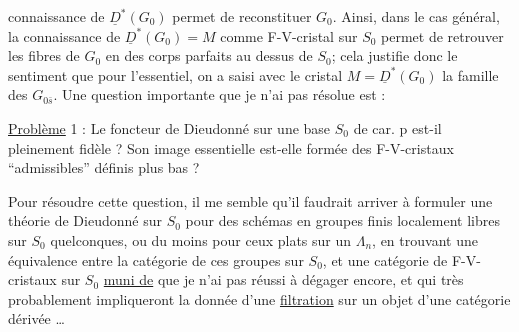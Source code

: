 connaissance de $\underline D^*(G_0)$ permet de reconstituer $G_0$. Ainsi, dans le cas général, la connaissance de $\underline D^*(G_0)=M$ comme F-V-cristal sur $S_0$ permet de retrouver les fibres de $G_0$ en des corps parfaits au dessus de $S_0$; cela justifie donc le sentiment que pour l'essentiel, on a saisi avec le cristal $M=\underline D^*(G_0)$ la famille des $G_{0\bar s}$. Une question importante  que je n'ai pas résolue est :

\uline{Problème} 1 : Le foncteur de Dieudonné sur une base $S_0$ de car. p est-il pleinement fidèle ?  Son image essentielle est-elle formée des F-V-cristaux ``admissibles'' définis plus bas ?

Pour résoudre cette question, il me semble qu'il faudrait arriver à formuler une théorie de Dieudonné sur  $S_0$ pour des schémas en groupes finis localement libres sur $S_0$ quelconques, ou du moins pour ceux plats sur un $\Lambda_n$, en trouvant une équivalence entre  la catégorie de ces groupes sur $S_0$, et une catégorie de F-V-cristaux sur $S_0$ \uline{muni de} \inserted{$(\unsure{*|\dagger})$} que je n'ai pas réussi à dégager encore, et qui très probablement impliqueront la donnée d'une \uline{filtration} sur un objet  d'une catégorie dérivée \ldots
{}

